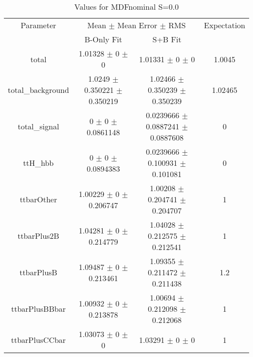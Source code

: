 \begin{table}
\centering
\caption{Values for MDFnominal S=0.0}
\begin{tabular}{cccc}
\toprule
Parameter & \multicolumn{2}{c}{Mean $\pm$ Mean Error $\pm$ RMS} & Expectation\\
 & B-Only Fit & S+B Fit & \\
\midrule
total & \num{1.01328} $\pm$ \num{0} $\pm$ \num{0} & \num{1.01331} $\pm$ \num{0} $\pm$ \num{0} & \num{1.0045}\\
total\_background & \num{1.0249} $\pm$ \num{0.350221} $\pm$ \num{0.350219} & \num{1.02466} $\pm$ \num{0.350239} $\pm$ \num{0.350239} & \num{1.02465}\\
total\_signal & \num{0} $\pm$ \num{0} $\pm$ \num{0.0861148} & \num{0.0239666} $\pm$ \num{0.0887241} $\pm$ \num{0.0887608} & \num{0}\\
ttH\_hbb & \num{0} $\pm$ \num{0} $\pm$ \num{0.0894383} & \num{0.0239666} $\pm$ \num{0.100931} $\pm$ \num{0.101081} & \num{0}\\
ttbarOther & \num{1.00229} $\pm$ \num{0} $\pm$ \num{0.206747} & \num{1.00208} $\pm$ \num{0.204741} $\pm$ \num{0.204707} & \num{1}\\
ttbarPlus2B & \num{1.04281} $\pm$ \num{0} $\pm$ \num{0.214779} & \num{1.04028} $\pm$ \num{0.212575} $\pm$ \num{0.212541} & \num{1}\\
ttbarPlusB & \num{1.09487} $\pm$ \num{0} $\pm$ \num{0.213461} & \num{1.09355} $\pm$ \num{0.211472} $\pm$ \num{0.211438} & \num{1.2}\\
ttbarPlusBBbar & \num{1.00932} $\pm$ \num{0} $\pm$ \num{0.213878} & \num{1.00694} $\pm$ \num{0.212098} $\pm$ \num{0.212068} & \num{1}\\
ttbarPlusCCbar & \num{1.03073} $\pm$ \num{0} $\pm$ \num{0} & \num{1.03291} $\pm$ \num{0} $\pm$ \num{0} & \num{1}\\
\bottomrule
\end{tabular}
\end{table}